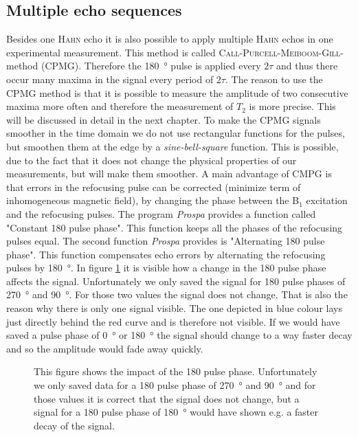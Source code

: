 \subsection{Multiple echo sequences}
\label{sec:Multipleechosequences}
Besides one \textsc{Hahn} echo it is also possible to apply multiple \textsc{Hahn} echos in one experimental measurement.
This method is called \textsc{Call-Purcell-Meiboom-Gill}-method (CPMG).
Therefore the \SI{180}{\degree} pulse is applied every $2\tau$ and thus there occur many maxima in the signal every period of $2\tau$.
The reason to use the CPMG method is that it is possible to measure the amplitude of two consecutive maxima more often and therefore the measurement of $T_2$ is more precise.
This will be discussed in detail in the next chapter.\newline
To make the CPMG signals smoother in the time domain we do not use rectangular functions for the pulses, but smoothen them at the edge by a \textit{sine-bell-square} function.
This is possible, due to the fact that it does not change the physical properties of our measurements, but will make them smoother.\newline
A main advantage of CMPG is that errors in the refocusing pulse can be corrected (minimize term of inhomogeneous magnetic field), by changing the phase between the B$_1$ excitation and the refocusing pulses.
The program \textit{Prospa} provides a function called "Constant 180 pulse phase".
This function keeps all the phases of the refocusing pulses equal.
The second function \textit{Prospa} provides is "Alternating 180 pulse phase".
This function compensates echo errors by alternating the refocusing pulses by \SI{180}{\degree}.
In figure \ref{fig:180pulsephasedegree} it is visible how a change in the 180 pulse phase affects the signal.
Unfortunately we only saved the signal for 180 pulse phases of \SI{270}{\degree} and \SI{90}{\degree}.
For those two values the signal does not change. That is also the reason why there is only one signal visible.
The one depicted in blue colour lays just directly behind the red curve and is therefore not visible.
If we would have saved a pulse phase of \SI{0}{\degree} or \SI{180}{\degree} the signal should change to a way faster decay and so the amplitude would fade away quickly.

\begin{figure}[H]
    \centering
    
    \caption[This figure shows the impact of the 180 pulse phase.]{This figure shows the impact of the 180 pulse phase.
    Unfortunately we only saved data for a 180 pulse phase of \SI{270}{\degree} and \SI{90}{\degree} and for those values it is correct that the signal does not change, but a signal for a 180 pulse phase of \SI{180}{\degree} would have shown e.g. a faster decay of the signal.}
    \label{fig:180pulsephasedegree}
\end{figure}